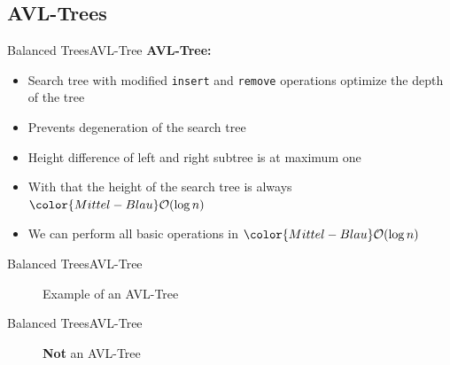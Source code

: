 \subsection{AVL-Trees}

\begin{frame}{Balanced Trees}{AVL-Tree}
  \textbf{AVL-Tree:}
  \begin{itemize}
    \item
      Search tree with modified \texttt{\color{Mittel-Blau}insert} and
      \texttt{\color{Mittel-Blau}remove} operations optimize the
      {\color{Mittel-Blau}depth} of the tree
    \item
      Prevents degeneration of the search tree
    \item
      Height difference of left and right subtree is at maximum one
    \item
      With that the height of the search tree is always
      ${\color{Mittel-Blau}\mathcal{O}(\log n)}$
    \item
      We can perform all basic operations in
      ${\color{Mittel-Blau}\mathcal{O}(\log n)}$
  \end{itemize}
\end{frame}


\begin{frame}{Balanced Trees}{AVL-Tree}
  \begin{figure}
    \begin{adjustbox}{width=0.75\linewidth}
      
    \end{adjustbox}
    \caption{Example of an AVL-Tree}
    \label{fig:balanced_trees:avl_tree_example1}
  \end{figure}
\end{frame}


\begin{frame}{Balanced Trees}{AVL-Tree}
  \begin{figure}
    \begin{adjustbox}{width=0.75\linewidth}
      
    \end{adjustbox}
    \caption{\textbf{Not} an AVL-Tree}
    \label{fig:balanced_trees:avl_tree_example2}
  \end{figure}
\end{frame}

